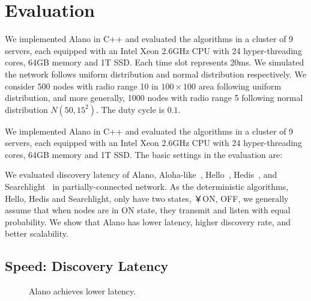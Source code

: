 \section{Evaluation}
\label{Evaluation}


We implemented Alano in C++ and evaluated the algorithms in a cluster of 9 servers, each equipped with an Intel Xeon 2.6GHz CPU with 24 hyper-threading cores, 64GB memory and 1T SSD. 
Each time slot represents 20ms. We simulated the network follows uniform distribution and normal distribution respectively. We consider 500 nodes with radio range 10 in $100\times100$ area following uniform distribution, and more generally, 1000 nodes with radio range 5 following normal distribution $N(50, 15^2)$. The duty cycle is $0.1$.

We implemented Alano in C++ and evaluated the algorithms in a cluster of 9 servers, each equipped with an Intel Xeon 2.6GHz CPU with 24 hyper-threading cores, 64GB memory and 1T SSD. The basic settings in the evaluation are: 


We evaluated discovery latency of Alano, Aloha-like~\cite{You2011}, Hello~\cite{Sun2014b}, Hedis~\cite{}, and Searchlight~\cite{} in partially-connected network. As the deterministic algorithms, Hello, Hedis and Searchlight, only have two states, ￥{ON, OFF}, we generally assume that when nodes are in ON state, they transmit and listen with equal probability.
We show that Alano has lower latency, higher discovery rate, and better scalability.

\subsection{Speed: Discovery Latency}

\begin{figure}[!t]
\centering
{}
\hspace{0.01in}
\caption{Alano achieves lower latency.}
\label{fig_latency}
\end{figure}

